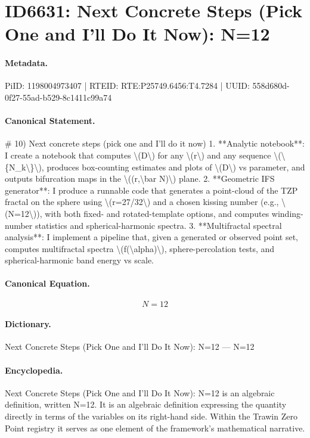 \section*{ID6631: Next Concrete Steps (Pick One and I’ll Do It Now): N=12}
\paragraph{Metadata.}
PiID: 1198004973407 | RTEID: RTE:P25749.6456:T4.7284 | UUID: 558d680d-0f27-55ad-b529-8c1411c99a74

\paragraph{Canonical Statement.}
\# 10) Next concrete steps (pick one and I’ll do it now) 1. **Analytic notebook**: I create a notebook that computes \textbackslash{}(D\textbackslash{}) for any \textbackslash{}(r\textbackslash{}) and any sequence \textbackslash{}(\textbackslash{}\{N\_k\textbackslash{}\}\textbackslash{}), produces box-counting estimates and plots of \textbackslash{}(D\textbackslash{}) vs parameter, and outputs bifurcation maps in the \textbackslash{}((r,\textbackslash{}bar N)\textbackslash{}) plane. 2. **Geometric IFS generator**: I produce a runnable code that generates a point-cloud of the TZP fractal on the sphere using \textbackslash{}(r=27/32\textbackslash{}) and a chosen kissing number (e.g., \textbackslash{}(N=12\textbackslash{})), with both fixed- and rotated-template options, and computes winding-number statistics and spherical-harmonic spectra. 3. **Multifractal spectral analysis**: I implement a pipeline that, given a generated or observed point set, computes multifractal spectra \textbackslash{}(f(\textbackslash{}alpha)\textbackslash{}), sphere-percolation tests, and spherical-harmonic band energy vs scale.

\paragraph{Canonical Equation.}
\[
N=12
\]

\paragraph{Dictionary.}
Next Concrete Steps (Pick One and I’ll Do It Now): N=12 — N=12

\paragraph{Encyclopedia.}
Next Concrete Steps (Pick One and I’ll Do It Now): N=12 is an algebraic definition, written N=12. It is an algebraic definition expressing the quantity directly in terms of the variables on its right-hand side. Within the Trawin Zero Point registry it serves as one element of the framework's mathematical narrative.
